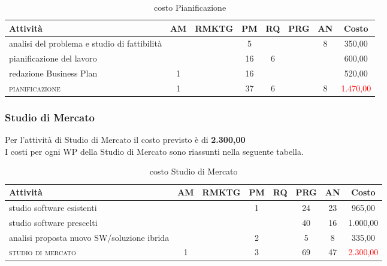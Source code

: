 \begin{table}[!h]
\footnotesize
\centering
\begin{tabular}{|p{}|c|c|c|c|c|c|c|}
\hline
\textbf{Attività}& \textbf{AM} & \textbf{RMKTG} & \textbf{PM} & \textbf{RQ} & \textbf{PRG} & \textbf{AN} & \textbf{Costo}  \\
\hline
analisi del problema e studio di fattibilità  & & & 5& & & 8& \text{\euro} 350,00\\
pianificazione del lavoro	 				  & & &	16&	6& & & \text{\euro} 600,00 \\	
redazione Business Plan						& 1 & &16& & & &  	\text{\euro} 520,00 \\			  
\hline
\scshape{}pianificazione   							& 1 & &37 &	6 &	&	8 &	\textcolor{red}{ \text{\euro}1.470,00 }\\		 
\hline
\end{tabular}
\caption{costo Pianificazione}\label{tab:pianificazione}
\end{table}

\subsubsection{Studio di Mercato}

Per l'attività di Studio di Mercato il costo previsto è di \textbf{ \text{\euro}2.300,00 }\\	
I costi per ogni WP della Studio di Mercato sono riassunti nella seguente tabella.

\begin{table}[!h]
\footnotesize
\centering
\begin{tabular}{|p{}|c|c|c|c|c|c|c|}
\hline
\textbf{Attività}& \textbf{AM} & \textbf{RMKTG} & \textbf{PM} & \textbf{RQ} & \textbf{PRG} & \textbf{AN} & \textbf{Costo}  \\ 
            
\hline
studio software esistenti & & & 1& & 24& 23& \text{\euro} 965,00\\
studio software prescelti	 				  & & &	&	&40 &16 & \text{\euro} 1.000,00 \\	
analisi proposta nuovo SW/soluzione ibrida 					  & & &2 & 	&5	&  8  &  	\text{\euro} 335,00 \\			  
\hline
\scshape{}studio di mercato  							& 1 &  &3 & &69	&47	&	\textcolor{red}{ \text{\euro}2.300,00 }\\		 
\hline
\end{tabular}
\caption{costo Studio di Mercato}\label{tab:mercato}
\end{table}

